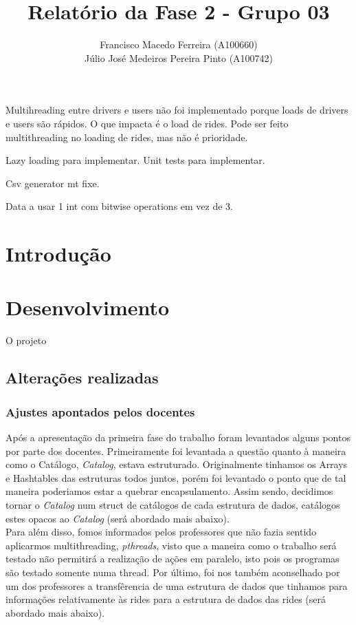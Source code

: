 \documentclass{article}
\title{Relatório da Fase 2 - Grupo 03}
\author{Francisco Macedo Ferreira (A100660)\\Júlio José Medeiros Pereira Pinto (A100742)}
\begin{document}
  
    \maketitle
    Multihreading entre drivers e users não foi implementado porque loads de drivers e users são rápidos.
    O que impacta é o load de rides.
    Pode ser feito multithreading no loading de rides, mas não é prioridade.

    Lazy loading para implementar.
    Unit tests para implementar.

    Csv generator mt fixe.

    Data a usar 1 int com bitwise operations em vez de 3.

    \section{Introdução}
    \lipsum[1]
    
    \section{Desenvolvimento}
    O projeto 
    \subsection{Alterações realizadas}
        \subsubsection{Ajustes apontados pelos docentes}
            Após a apresentação da primeira fase do trabalho foram levantados
            alguns pontos por parte dos docentes. Primeiramente foi levantada
            a questão quanto à maneira como o Catálogo, \emph{Catalog}, estava
            estruturado. Originalmente tinhamos os Arrays e Hashtables das estruturas
            todos juntos, porém foi levantado o ponto que de tal maneira poderiamos
            estar a quebrar encapsulamento. Assim sendo, decidimos tornar o \emph{Catalog}
            num struct de catálogos de cada estrutura de dados, catálogos estes opacos
            ao \emph{Catalog} (será abordado mais abaixo).\\Para além disso, fomos 
            informados pelos professores que não fazia sentido aplicarmos multithreading, \emph{pthreads}, 
            visto que a maneira como o trabalho será testado não permitirá a realização de ações
            em paralelo, isto pois os programas são testado somente numa thread. 
            Por último, foi nos também aconselhado por um dos professores a transfêrencia
            de uma estrutura de dados que tinhamos para informações relativamente às rides
            para a estrutura de dados das rides (será abordado mais abaixo).
\end{document}
